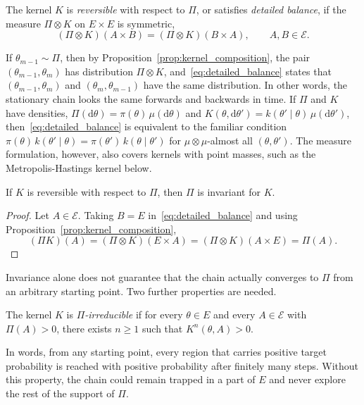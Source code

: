 \begin{definition}
    \label{def:reversibility}
    The kernel $K$ is \emph{reversible} with respect to $\Pi$, or satisfies \emph{detailed balance}, if the measure $\Pi\otimes K$ on $E\times E$ is symmetric,
    \begin{equation}
        (\Pi\otimes K)(A\times B) = (\Pi\otimes K)(B\times A), \qquad A,B\in\mathcal{E}.
        \label{eq:detailed_balance}
    \end{equation}
\end{definition}
If $\theta_{m-1}\sim\Pi$, then by Proposition~\ref{prop:kernel_composition}, the pair $(\theta_{m-1},\theta_m)$ has distribution $\Pi\otimes K$, and~\eqref{eq:detailed_balance} states that $(\theta_{m-1},\theta_m)$ and $(\theta_m,\theta_{m-1})$ have the same distribution. In other words, the stationary chain looks the same forwards and backwards in time. If $\Pi$ and $K$ have densities, $\Pi(\mathrm{d}\theta) = \pi(\theta)\,\mu(\mathrm{d}\theta)$ and $K(\theta,\mathrm{d}\theta') = k(\theta'\mid\theta)\,\mu(\mathrm{d}\theta')$, then~\eqref{eq:detailed_balance} is equivalent to the familiar condition $\pi(\theta)\,k(\theta'\mid\theta) = \pi(\theta')\,k(\theta\mid\theta')$ for $\mu\otimes\mu$-almost all $(\theta,\theta')$. The measure formulation, however, also covers kernels with point masses, such as the Metropolis-Hastings kernel below.

\begin{proposition}
    \label{prop:detailed_balance_invariance}
    If $K$ is reversible with respect to $\Pi$, then $\Pi$ is invariant for $K$.
\end{proposition}
\begin{proof}
    Let $A\in\mathcal{E}$. Taking $B = E$ in~\eqref{eq:detailed_balance} and using Proposition~\ref{prop:kernel_composition},
    \begin{equation}
        (\Pi K)(A) = (\Pi\otimes K)(E\times A) = (\Pi\otimes K)(A\times E) = \Pi(A).
    \end{equation}
\end{proof}

Invariance alone does not guarantee that the chain actually converges to $\Pi$ from an arbitrary starting point. Two further properties are needed.

\begin{definition}
    \label{def:irreducibility}
    The kernel $K$ is \emph{$\Pi$-irreducible} if for every $\theta\in E$ and every $A\in\mathcal{E}$ with $\Pi(A)>0$, there exists $n\ge1$ such that $K^n(\theta,A)>0$.
\end{definition}
In words, from any starting point, every region that carries positive target probability is reached with positive probability after finitely many steps. Without this property, the chain could remain trapped in a part of $E$ and never explore the rest of the support of $\Pi$.

